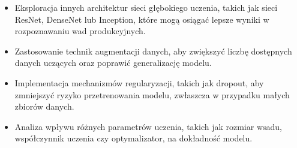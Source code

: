 \begin{itemize}
\begin{itemize}
\item Eksploracja innych architektur sieci głębokiego uczenia, takich jak sieci ResNet, DenseNet lub Inception, które mogą osiągać lepsze wyniki w rozpoznawaniu wad produkcyjnych.
\item Zastosowanie technik augmentacji danych, aby zwiększyć liczbę dostępnych danych uczących oraz poprawić generalizację modelu.
\item Implementacja mechanizmów regularyzacji, takich jak dropout, aby zmniejszyć ryzyko przetrenowania modelu, zwłaszcza w przypadku małych zbiorów danych.
\item Analiza wpływu różnych parametrów uczenia, takich jak rozmiar wsadu, współczynnik uczenia czy optymalizator, na dokładność modelu.
\end{itemize}

\end{itemize}